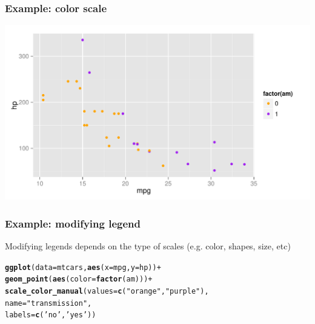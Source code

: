 \documentclass[12pt]{beamer}\usepackage[]{graphicx}\usepackage[]{color}
\makeatletter
\newcommand{\hlstr}[1]{\textcolor[rgb]{0.192,0.494,0.8}{#1}}%
\newcommand{\hlopt}[1]{\textcolor[rgb]{0,0,0}{#1}}%
\newcommand{\hlstd}[1]{\textcolor[rgb]{0.345,0.345,0.345}{#1}}%
\newcommand{\hlkwc}[1]{\textcolor[rgb]{0.333,0.667,0.333}{#1}}%
\newcommand{\hlkwd}[1]{\textcolor[rgb]{0.737,0.353,0.396}{\textbf{#1}}}%
\newenvironment{kframe}{%
 \def\at@end@of@kframe{}%
 \ifinner\ifhmode%
  \def\at@end@of@kframe{\end{minipage}}%
  \begin{minipage}{\columnwidth}%
 \fi\fi%
 \def\FrameCommand##1{\hskip\@totalleftmargin \hskip-\fboxsep
 \colorbox{shadecolor}{##1}\hskip-\fboxsep
     \hskip-\linewidth \hskip-\@totalleftmargin \hskip\columnwidth}%
 \MakeFramed {\advance\hsize-\width
   \@totalleftmargin\z@ \linewidth\hsize
   \@setminipage}}%
 {\par\unskip\endMakeFramed%
 \at@end@of@kframe}
\newenvironment{knitrout}{}{} %
\makeatother
\begin{document}

\begin{frame}[fragile]
\frametitle{Example: color scale}

\begin{knitrout}\footnotesize
{}\color{fgcolor}

{\centering \includegraphics[width=.9\linewidth,height=.5\linewidth]{figure/color_manual-1} 

}



\end{knitrout}

\end{frame}


\begin{frame}[fragile]
\frametitle{Example: modifying legend}

Modifying legends depends on the type of scales (e.g. color, shapes, size, etc)
\begin{knitrout}\footnotesize
{}\color{fgcolor}\begin{kframe}
\begin{alltt}
\hlkwd{ggplot}\hlstd{(}\hlkwc{data} \hlstd{= mtcars,} \hlkwd{aes}\hlstd{(}\hlkwc{x} \hlstd{= mpg,} \hlkwc{y} \hlstd{= hp))} \hlopt{+}
  \hlkwd{geom_point}\hlstd{(}\hlkwd{aes}\hlstd{(}\hlkwc{color} \hlstd{=} \hlkwd{factor}\hlstd{(am)))} \hlopt{+}
  \hlkwd{scale_color_manual}\hlstd{(}\hlkwc{values} \hlstd{=} \hlkwd{c}\hlstd{(}\hlstr{"orange"}\hlstd{,} \hlstr{"purple"}\hlstd{),}
                     \hlkwc{name} \hlstd{=} \hlstr{"transmission"}\hlstd{,}
                     \hlkwc{labels} \hlstd{=} \hlkwd{c}\hlstd{(}\hlstr{'no'}\hlstd{,} \hlstr{'yes'}\hlstd{))}
\end{alltt}
\end{kframe}
\end{knitrout}
\end{frame}
\end{document}
